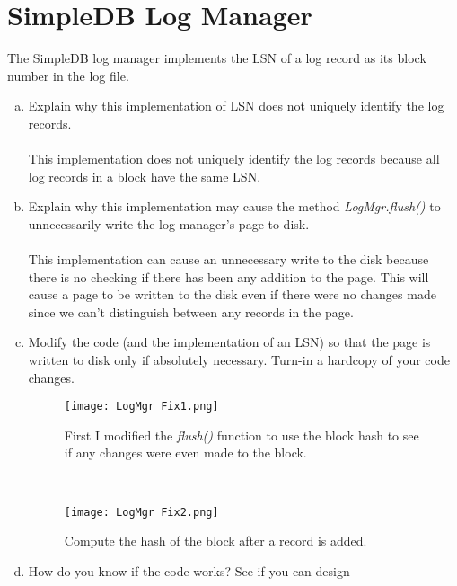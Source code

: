 \documentclass [letter,12pt] {article}
\begin{document}
\section{SimpleDB Log Manager}
    The SimpleDB log manager implements the LSN of a log record as its 
    block number in the log file.

    \begin{enumerate}[(a)]
        \item Explain why this implementation of LSN does not uniquely
            identify the log records.
            \\\\
            This implementation does not uniquely identify the log
            records because all log records in a block have the same
            LSN.
        \item Explain why this implementation may cause the method 
            \textit{LogMgr.flush()} to unnecessarily write the log manager’s page 
            to disk.
            \\\\
            This implementation can cause an unnecessary write to the
            disk because there is no checking if there has been any 
            addition to the page. This will cause a page to be written
            to the disk even if there were no changes made since we 
            can't distinguish between any records in the page.
        \item Modify the code (and the implementation of an LSN) so that
            the page is written to disk only if absolutely necessary. 
            Turn-in a hardcopy of your code changes.
            \\
            \begin{figure}[htp]
                \centering
                \texttt{[image: LogMgr Fix1.png]}
                \caption{First I modified the \textit{flush()} function to use the block hash to 
                    see if any changes were even made to the block.}
                \label{fig:logmgr1}
            \end{figure}
            \\
            \begin{figure}[htp]
                \centering
                \texttt{[image: LogMgr Fix2.png]}
                \caption{Compute the hash of the block after a record is added.}
                \label{fig:logmgr2}
            \end{figure}
        \item How do you know if the code works? See if you can design 

\end{enumerate}
\end{document}
